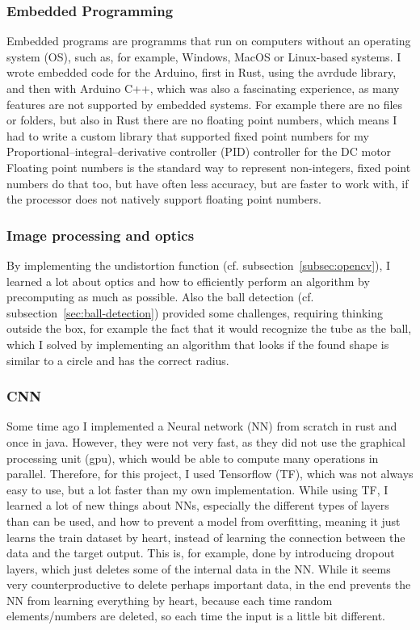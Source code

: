 \subsubsection{Embedded Programming}\label{subsubsec:embedded}
Embedded programs are programms that run on computers without an operating system (OS), such as, for example, Windows\autocite{windows}, MacOS\autocite{macos} or Linux-based systems\autocite{linux}.\autocite{embedded-software}
I wrote embedded code for the Arduino, first in Rust\autocite{rust}, using the avrdude library\autocite{avrdude}, and then with Arduino C++\autocite{arduino-c++}, which was also a fascinating experience, as many features are not supported by embedded systems.
For example there are no files or folders, but also in Rust there are no floating point numbers, which means I had to write a custom library that supported fixed point numbers for my Proportional–integral–derivative controller (PID)\autocite{pid} controller for the DC motor
Floating point numbers\autocite{floating-point} is the standard way to represent non-integers, fixed point numbers\autocite{fixed-point} do that too, but have often less accuracy, but are faster to work with, if the processor does not natively support floating point numbers.

\subsubsection{Image processing and optics}
By implementing the undistortion function (cf. subsection~\ref{subsec:opencv}), I learned a lot about optics and how to efficiently perform an algorithm by precomputing as much as possible.
Also the ball detection (cf. subsection~\ref{sec:ball-detection}) provided some challenges, requiring thinking outside the box, for example the fact that it would recognize the tube as the ball, which I solved by implementing an algorithm that looks if the found shape is similar to a circle and has the correct radius.

\subsubsection{CNN}
Some time ago I implemented a Neural network (NN) from scratch in rust and once in java.
However, they were not very fast, as they did not use the graphical processing unit (gpu), which would be able to compute many operations in parallel.
Therefore, for this project, I used Tensorflow (TF), which was not always easy to use, but a lot faster than my own implementation.
While using TF, I learned a lot of new things about NNs, especially the different types of layers than can be used, and how to prevent a model from overfitting, meaning it just learns the train dataset by heart, instead of learning the connection between the data and the target output.
This is, for example, done by introducing dropout layers, which just deletes some of the internal data in the NN.
While it seems very counterproductive to delete perhaps important data, in the end prevents the NN from learning everything by heart, because each time random elements/numbers are deleted, so each time the input is a little bit different.


